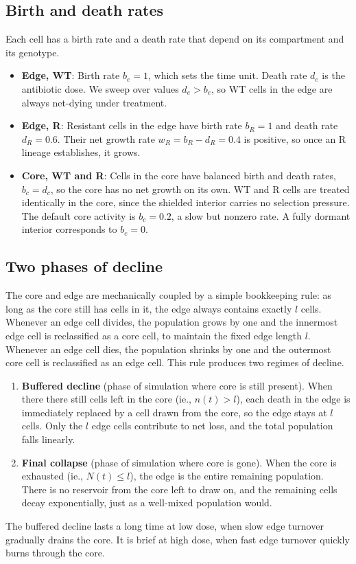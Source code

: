 \documentclass[11pt]{article}
\newcommand{\bEdge}{b_e}
\newcommand{\dEdge}{d_e}
\newcommand{\bCore}{b_c}
\newcommand{\dCore}{d_c}
\newcommand{\bR}{b_R}
\newcommand{\dR}{d_R}
\newcommand{\wR}{w_R}
\begin{document}
\subsection{Birth and death rates}
Each cell has a birth rate and a death rate that depend on its
compartment and its genotype.
\begin{itemize}
    \item \textbf{Edge, WT}: Birth rate $\bEdge = 1$, which sets the
    time unit. Death rate $\dEdge$ is the antibiotic dose. We sweep
    over values $\dEdge > \bEdge$, so WT cells in the edge are
    always net-dying under treatment.
    \item \textbf{Edge, R}: Resistant cells in the edge have birth
    rate $\bR = 1$ and death rate $\dR = 0.6$. Their net growth rate
    $\wR = \bR - \dR = 0.4$ is positive, so once an R lineage
    establishes, it grows.
    \item \textbf{Core, WT and R}: Cells in the core have balanced
    birth and death rates, $\bCore = \dCore$, so the core has no net
    growth on its own. WT and R cells are treated identically in the
    core, since the shielded interior carries no selection pressure.
    The default core activity is $\bCore = 0.2$, a slow but nonzero
    rate. A fully dormant interior corresponds to $\bCore = 0$.
\end{itemize}

\subsection{Two phases of decline}
The core and edge are mechanically coupled by a simple bookkeeping
rule: as long as the core still has cells in it, the edge always
contains exactly $l$ cells. Whenever an edge cell divides, the
population grows by one and the innermost edge cell is reclassified
as a core cell, to maintain the fixed edge length $l$. Whenever an edge cell dies, the population shrinks
by one and the outermost core cell is reclassified as an edge cell.
This rule produces two regimes of decline.
\begin{enumerate}
    \item \textbf{Buffered decline} (phase of simulation where core is still present). When there there still cells left in the core (ie., $n(t) > l$), each death in the edge is immediately replaced by a cell drawn from the core, so the edge stays at $l$ cells. Only the $l$ edge cells
    contribute to net loss, and the total population falls linearly.
    \item \textbf{Final collapse} (phase of simulation where core is gone). When the core is exhausted (ie., $N(t) \leq l$), the edge is the entire remaining population. There is no reservoir from the core left to draw on, and the remaining cells decay exponentially, just as a well-mixed population would.
\end{enumerate}
The buffered decline lasts a long time at low dose, when slow edge
turnover gradually drains the core. It is brief at high dose, when
fast edge turnover quickly burns through the core.
\end{document}
